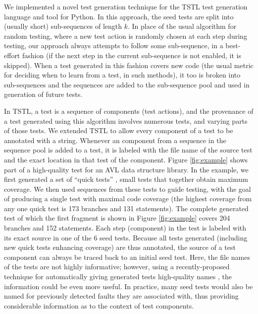 \documentclass[final]{article}
\begin{document}
We implemented a novel test generation technique for the TSTL
\cite{tstlsttt,nfm15,issta15,tstl} test generation language and tool for
Python.  In this approach, the seed tests are split into (usually short)
sub-sequences of length $k$.  In place of the usual algorithm for
random testing, where a new test action is randomly chosen at each
step during testing, our approach always attempts to follow some
sub-sequence, in a best-effort fashion (if the next step in the
current sub-sequence is not enabled, it is skipped).  When a test
generated in this fashion covers new code (the usual metric for
deciding when to learn from a test, in such methods), it too is broken into sub-sequences
and the sequences are added to the sub-sequence pool and used in generation of
future tests.

In TSTL, a test is a sequence of components (test actions), and the
provenance of a test generated using this algorithm involves numerous
tests, and varying parts of those tests.  We extended TSTL to allow
every component of a test to be annotated with a string.  Whenever an
component from a sequence in the sequence pool is added to a test, it
is labeled with the file name of the source test and the exact
location in that test of the component.  Figure \ref{fig:example}
shows part of a high-quality test for an AVL data structure library.  In the
example, we first generated a set of ``quick tests''
\cite{icst2014,stvrcausereduce}, small tests that together obtain
maximum coverage.  We then used sequences from these tests to guide
testing, with the goal of producing a single test with maximal code
coverage (the highest coverage from any one quick test is 173 branches
and 131 statements).  The complete generated test of which the first fragment
is shown in Figure \ref{fig:example}
covers 204 branches and 152 statements.  Each step (component) in the
test is labeled with its exact source in one of the 6 seed tests.
Because all tests generated (including new quick tests enhancing
coverage) are thus annotated, the source of a test component can always be
traced back to an initial seed test.  Here, the file names of the
tests are not highly informative; however, using a recently-proposed
technique for automatically giving generated tests high-quality names
\cite{Daka:2017:GUT:3092703.3092727}, the information could be even
more useful.  In practice, many seed tests would also be named for
previously detected faults they are associated with, thus providing
considerable information as to the context of test components.
\end{document}
